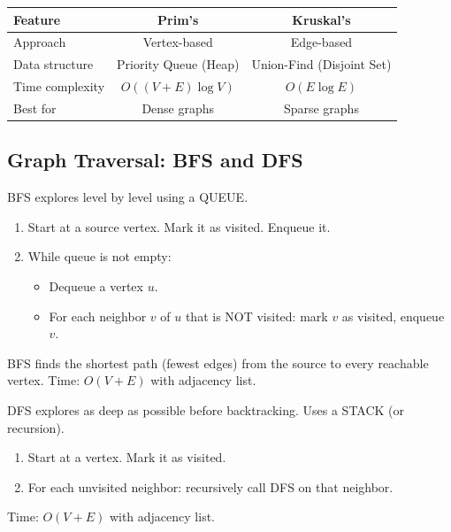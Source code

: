 \documentclass[12pt,portrait]{article}
\begin{document}
\begin{center}
\begin{tabular}{l|c|c}
\toprule
\textbf{Feature} & \textbf{Prim's} & \textbf{Kruskal's} \\
\midrule
Approach & Vertex-based & Edge-based \\
Data structure & Priority Queue (Heap) & Union-Find (Disjoint Set) \\
Time complexity & $O((V+E)\log V)$ & $O(E\log E)$ \\
Best for & Dense graphs & Sparse graphs \\
\bottomrule
\end{tabular}
\end{center}

\subsection{Graph Traversal: BFS and DFS}
\label{sec:graph_traversal}

\begin{rulebox}
BFS explores level by level using a QUEUE.
\begin{enumerate}[leftmargin=*]
    \item Start at a source vertex. Mark it as visited. Enqueue it.
    \item While queue is not empty:
    \begin{itemize}[leftmargin=*]
        \item Dequeue a vertex $u$.
        \item For each neighbor $v$ of $u$ that is NOT visited: mark $v$ as visited, enqueue $v$.
    \end{itemize}
\end{enumerate}
BFS finds the shortest path (fewest edges) from the source to every reachable vertex. Time: $O(V+E)$ with adjacency list.
\end{rulebox}

\begin{rulebox}
DFS explores as deep as possible before backtracking. Uses a STACK (or recursion).
\begin{enumerate}[leftmargin=*]
    \item Start at a vertex. Mark it as visited.
    \item For each unvisited neighbor: recursively call DFS on that neighbor.
\end{enumerate}
Time: $O(V+E)$ with adjacency list.
\end{rulebox}
\end{document}
